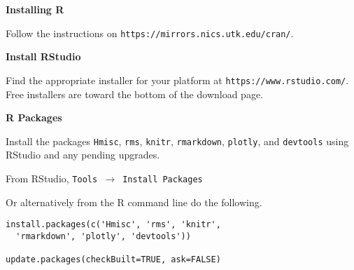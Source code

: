 \documentclass[twocolumn]{article}
\begin{document}
\begin{flushleft}

\textbf{Installing R}

Follow the instructions on \texttt{https://mirrors.nics.utk.edu/cran/}.

\textbf{Install RStudio}

Find the appropriate installer for your platform at \texttt{https://www.rstudio.com/}. Free installers are toward the bottom of the download page.

\textbf{R Packages}

Install the packages \texttt{Hmisc}, \texttt{rms}, \texttt{knitr}, \texttt{rmarkdown}, \texttt{plotly}, and \texttt{devtools} using RStudio and any pending upgrades.

From RStudio, \texttt{Tools $\rightarrow$ Install Packages}

Or alternatively from the R command line do the following.

\begin{framed}
\begin{verbatim}
install.packages(c('Hmisc', 'rms', 'knitr',
  'rmarkdown', 'plotly', 'devtools'))
  
update.packages(checkBuilt=TRUE, ask=FALSE)
\end{verbatim}
\end{framed}

\end{flushleft}

\vspace*{\fill}

\pagebreak
\end{document}

